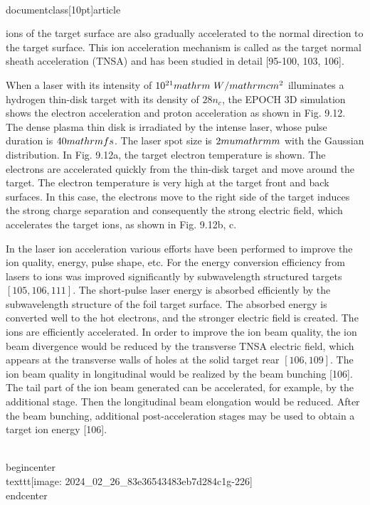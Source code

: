 \\documentclass[10pt]{article}
\begin{document}
{{{{{{ions of the target surface are also gradually accelerated to the normal direction to the target surface. This ion acceleration mechanism is called as the target normal sheath acceleration (TNSA) and has been studied in detail [95-100, 103, 106].

When a laser with its intensity of $10^{21} \\mathrm{~W} / \\mathrm{cm}^{2}$ illuminates a hydrogen thin-disk target with its density of $28 n_{c}$, the EPOCH 3D simulation shows the electron acceleration and proton acceleration as shown in Fig. 9.12. The dense plasma thin disk is irradiated by the intense laser, whose pulse duration is $40 \\mathrm{fs}$. The laser spot size is $2 \\mu \\mathrm{m}$ with the Gaussian distribution. In Fig. 9.12a, the target electron temperature is shown. The electrons are accelerated quickly from the thin-disk target and move around the target. The electron temperature is very high at the target front and back surfaces. In this case, the electrons move to the right side of the target induces the strong charge separation and consequently the strong electric field, which accelerates the target ions, as shown in Fig. 9.12b, c.

In the laser ion acceleration various efforts have been performed to improve the ion quality, energy, pulse shape, etc. For the energy conversion efficiency from lasers to ions was improved significantly by subwavelength structured targets $[105,106,111]$. The short-pulse laser energy is absorbed efficiently by the subwavelength structure of the foil target surface. The absorbed energy is converted well to the hot electrons, and the stronger electric field is created. The ions are efficiently accelerated. In order to improve the ion beam quality, the ion beam divergence would be reduced by the transverse TNSA electric field, which appears at the transverse walls of holes at the solid target rear $[106,109]$. The ion beam quality in longitudinal would be realized by the beam bunching [106]. The tail part of the ion beam generated can be accelerated, for example, by the additional stage. Then the longitudinal beam elongation would be reduced. After the beam bunching, additional post-acceleration stages may be used to obtain a target ion energy [106].

\\begin{center}
\\texttt{[image: 2024\_02\_26\_83e36543483eb7d284c1g-226]}
\\end{center}

}}}}}}
\end{document}
